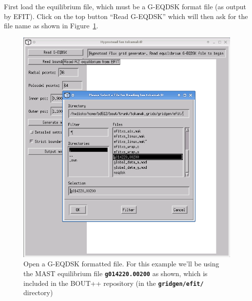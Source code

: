\documentclass[12pt, a4paper]{article}
\newcommand{\file}[1]{\texttt{\bf #1}}
\begin{document}
First load the equilibrium file, which must be a G-EQDSK format file
(as output by EFIT). Click on the top button ``Read G-EQDSK'' which will
then ask for the file name as shown in Figure~\ref{fig:screen_1}.
\begin{figure}[h!]
  \centering
  \includegraphics[width=0.5\paperwidth, keepaspectratio]{screen_1.png}
  \caption{Open a G-EQDSK formatted file. For this example we'll be using
    the MAST equilibrium file \file{g014220.00200} as shown, which is included
    in the BOUT++ repository (in the \file{gridgen/efit/} directory)}
  \label{fig:screen_1}
\end{figure}
\clearpage
\end{document}
